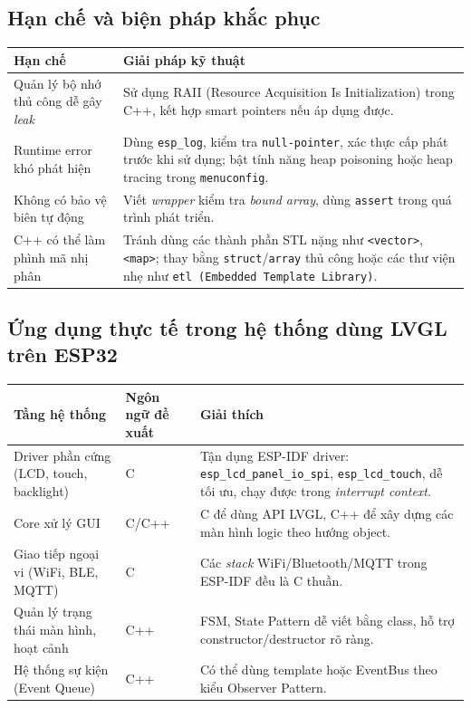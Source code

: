 \subsection{Hạn chế và biện pháp khắc phục}

\begin{table}[H]
\centering
\begin{tabular}{|p{6cm}|p{8.5cm}|}
\hline
\textbf{Hạn chế} & \textbf{Giải pháp kỹ thuật} \\
\hline
Quản lý bộ nhớ thủ công dễ gây \textit{leak} & Sử dụng RAII (Resource Acquisition Is Initialization) trong C++, kết hợp smart pointers nếu áp dụng được. \\
\hline
Runtime error khó phát hiện & Dùng \texttt{esp\_log}, kiểm tra \texttt{null-pointer}, xác thực cấp phát trước khi sử dụng; bật tính năng heap poisoning hoặc heap tracing trong \texttt{menuconfig}. \\
\hline
Không có bảo vệ biên tự động & Viết \textit{wrapper} kiểm tra \textit{bound array}, dùng \texttt{assert} trong quá trình phát triển. \\
\hline
C++ có thể làm phình mã nhị phân & Tránh dùng các thành phần STL nặng như \texttt{<vector>}, \texttt{<map>}; thay bằng \texttt{struct}/\texttt{array} thủ công hoặc các thư viện nhẹ như \texttt{etl (Embedded Template Library)}. \\
\hline
\end{tabular}
\end{table}

\subsection{Ứng dụng thực tế trong hệ thống dùng LVGL trên ESP32}

\begin{table}[H]
\centering
\begin{tabular}{|p{5cm}|p{3cm}|p{6.5cm}|}
\hline
\textbf{Tầng hệ thống} & \textbf{Ngôn ngữ đề xuất} & \textbf{Giải thích} \\
\hline
Driver phần cứng (LCD, touch, backlight) & C & Tận dụng ESP-IDF driver: \texttt{esp\_lcd\_panel\_io\_spi}, \texttt{esp\_lcd\_touch}, dễ tối ưu, chạy được trong \textit{interrupt context}. \\
\hline
Core xử lý GUI & C/C++ & C để dùng API LVGL, C++ để xây dựng các màn hình logic theo hướng object. \\
\hline
Giao tiếp ngoại vi (WiFi, BLE, MQTT) & C & Các \textit{stack} WiFi/Bluetooth/MQTT trong ESP-IDF đều là C thuần. \\
\hline
Quản lý trạng thái màn hình, hoạt cảnh & C++ & FSM, State Pattern dễ viết bằng class, hỗ trợ constructor/destructor rõ ràng. \\
\hline
Hệ thống sự kiện (Event Queue) & C++ & Có thể dùng template hoặc EventBus theo kiểu Observer Pattern. \\
\hline
\end{tabular}
\end{table}
